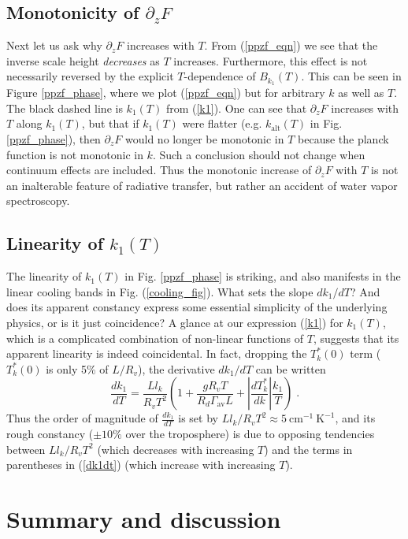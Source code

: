 \documentclass[10pt]{article}
\newcommand{\beqn}{\begin{equation}}
\newcommand{\eeqn}{\end{equation}}
\newcommand{\eqnref}[1]{(\ref{#1})}
\newcommand{\der}[2]{\ensuremath{\frac{d #1}{d #2}}}
\newcommand{\ppz}{\ensuremath{\partial_z}}
\newcommand{\cminverse}{\ensuremath{\mathrm{cm^{-1}}}}
\newcommand{\gammaav}{\ensuremath{\Gamma_\mathrm{av}}}
\newcommand{\Kinverse}{\ensuremath{\mathrm{K^{-1}}}}
\begin{document}
	\subsection{Monotonicity of $\ppz F$}
Next let us ask why $\ppz F$ increases with $T$. From \eqnref{ppzf_eqn} we see that the inverse scale height  \emph{decreases}  as $T$ increases.  Furthermore, this effect is not necessarily reversed by the explicit $T$-dependence of $B_{k_1}(T)$. This can be seen in Figure \ref{ppzf_phase}, where we plot \eqnref{ppzf_eqn} but for arbitrary $k$ as well as $T$. The black dashed line is  $k_1(T)$ from \eqnref{k1}. One can see that $\ppz F$ increases with $T$ along  $k_1(T)$, but that if $k_1(T)$ were flatter (e.g. $k_{\mathrm{alt}}(T)$ in Fig. \ref{ppzf_phase}), then $\ppz F$ would no longer be monotonic in $T$ because the planck function is not monotonic in $k$. Such a conclusion should not change when continuum effects are included. Thus the monotonic increase of $\ppz F$ with $T$ is not an inalterable feature of radiative transfer, but rather an accident of water vapor spectroscopy.

	\subsection{Linearity of $k_1(T)$}
The linearity of  $k_1(T)$ in Fig. \ref{ppzf_phase} is striking, and also manifests in the linear cooling bands in Fig. \eqnref{cooling_fig}. What sets the slope $d k_1/dT$? And does its apparent constancy express some essential simplicity of the underlying physics, or is it just coincidence? A glance at our expression \eqnref{k1} for $k_1(T)$, which is a complicated combination of non-linear functions of $T$, suggests that its apparent  linearity is indeed coincidental. In fact,  dropping the $T_k^*(0)$ term ($T_k^*(0)$ is only 5\% of $L/R_v$), the derivative $d k_1/dT$ can be written
	\beqn
		\der{k_1}{T} = \frac{Ll_k}{R_v T^2}\left( 1 + \frac{gR_vT}{R_d \gammaav L} + \left|\der{T_k^*}{k}\right| \frac{k_1}{T} \right) \; .
	\label{dk1dt}
	\eeqn
Thus the order of magnitude of $\der{k_1}{T}$ is set by $Ll_k/R_vT^2 \approx 5\ \cminverse\ \Kinverse $, and its rough constancy ($\pm 10\%$ over the troposphere) is due to opposing tendencies between $Ll_k/R_vT^2$ (which decreases with increasing $T$) and the terms in parentheses in \eqnref{dk1dt} (which increase with increasing $T$).


\section{Summary and discussion}
	
\end{document}
